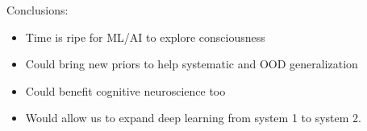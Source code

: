 Conclusions:
\begin{itemize}
    \item Time is ripe for ML/AI to explore consciousness
    \item Could bring new priors to help systematic and OOD generalization
    \item Could benefit cognitive neuroscience too
    \item Would allow us to expand deep learning from system 1 to system 2.
\end{itemize}





